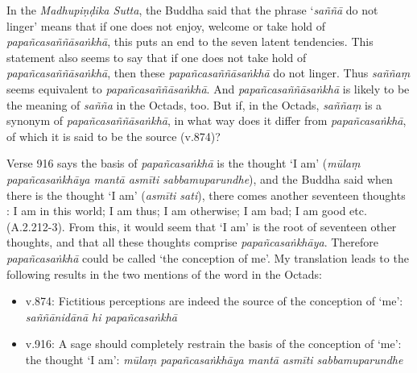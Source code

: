 In the \textit{Madhupiṇḍika Sutta}, the Buddha said that the phrase `\textit{saññā} do not linger' means that if one does not enjoy, welcome or take hold of \textit{papañcasaññāsaṅkhā}, this puts an end to the seven latent tendencies. This statement also seems to say that if one does not take hold of \textit{papañcasaññāsaṅkhā}, then these \textit{papañcasaññāsaṅkhā} do not linger. Thus \textit{saññaṃ} seems equivalent to \textit{papañcasaññāsaṅkhā}. And \textit{papañcasaññāsaṅkhā} is likely to be the meaning of \textit{sañña} in the Octads, too. But if, in the Octads, \textit{saññaṃ} is a synonym of \textit{papañcasaññāsaṅkhā}, in what way does it differ from \textit{papañcasaṅkhā}, of which it is said to be the source (v.874)?

Verse 916 says the basis of \textit{papañcasaṅkhā} is the thought `I am' (\textit{mūlaṃ papañcasaṅkhāya mantā asmīti sabbamuparundhe}), and the Buddha said when there is the thought `I am' (\textit{asmīti sati}), there comes another seventeen thoughts : I am in this world; I am thus; I am otherwise; I am bad; I am good etc. (A.2.212-3). From this, it would seem that `I am' is the root of seventeen other thoughts, and that all these thoughts comprise \textit{papañcasaṅkhāya}. Therefore \textit{papañcasaṅkhā} could be called `the conception of me'. My translation leads to the following results in the two mentions of the word in the Octads:

\begin{itemize}
\item v.874: Fictitious perceptions are indeed the source of the conception of `me': \textit{saññānidānā hi papañcasaṅkhā}
\item v.916: A sage should completely restrain the basis of the conception of `me': the thought `I am': \textit{mūlaṃ papañcasaṅkhāya mantā asmīti sabbamuparundhe}
\end{itemize}

